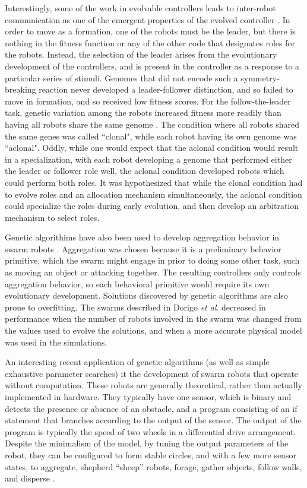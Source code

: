 Interestingly, some of the work in evolvable controllers leads to inter-robot communication as one of the emergent properties of the evolved controller \citep{quinn2001evolving}.
In order to move as a formation, one of the robots must be the leader, but there is nothing in the fitness function or any of the other code that designates roles for the robots. 
Instead, the selection of the leader arises from the evolutionary development of the controllers, and is present in the controller as a response to a particular series of stimuli. 
Genomes that did not encode such a symmetry-breaking reaction never developed a leader-follower distinction, and so failed to move in formation, and so received low fitness scores. 
For the follow-the-leader task, genetic variation among the robots increased fitness more readily than having all robots share the same genome \citep{quinn2001comparison}.
The condition where all robots shared the same genes was called ``clonal", while each robot having its own genome was ``aclonal".
Oddly, while one would expect that the aclonal condition would result in a specialization, with each robot developing a genome that performed either the leader or follower role well, the aclonal condition developed robots which could perform both roles. 
It was hypothesized that while the clonal condition had to evolve roles and an allocation mechanism simultaneously, the aclonal condition could specialize the roles during early evolution, and then develop an arbitration mechanism to select roles.

Genetic algorithims have also been used to develop aggregation behavior in swarm robots \citep{bahgecci2005evolving, dorigo2004evolving}.  
Aggregation was chosen because it is a preliminary behavior primitive, which the swarm might engage in prior to doing some other task, such as moving an object or attacking together.
The resulting controllers only controls aggregation behavior, so each behavioral primitive would require its own evolutionary development. 
Solutions discovered by genetic algorithms are also prone to overfitting. 
The swarms described in Dorigo \emph{et al}. decreased in performance when the number of robots involved in the swarm was changed from the values used to evolve the solutions, and when a more accurate physical model was used in the simulations.

An interesting recent application of genetic algorithms (as well as simple exhaustive parameter searches) it the development of swarm robots that operate without computation. 
These robots are generally theoretical, rather than actually implemented in hardware. 
They typically have one sensor, which is binary and detects the presence or absence of an obstacle, and a program consisting of an if statement that branches according to the output of the sensor. 
The output of the program is typically the speed of two wheels in a differential drive arrangement.
Despite the minimalism of the model, by tuning the output parameters of the robot, they can be configured to form stable circles, and with a few more sensor states, to aggregate, shepherd ``sheep'' robots, forage, gather objects, follow walls, and disperse \citep{gauci2014self, johnson2016evolving, ozdemir2017shepherding, brown2018discovery, stcircle}. 

